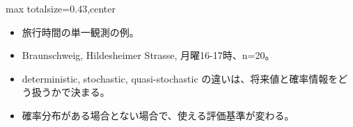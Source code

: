 \clearpage
{}
\begin{minipage}[t]{0.405\textwidth}
\begin{adjustbox}{max totalsize={\textwidth}{0.43\textheight},center}
\begin{minipage}{\textwidth}\scriptsize
{}\begin{itemize}
\item 旅行時間の単一観測の例。
\item Braunschweig, Hildesheimer Strasse, 月曜16-17時、n=20。
\end{itemize}\begin{itemize}
\item deterministic, stochastic, quasi-stochastic の違いは、将来値と確率情報をどう扱うかで決まる。
\item 確率分布がある場合とない場合で、使える評価基準が変わる。
\end{itemize}
\end{minipage}
\end{adjustbox}
\end{minipage}\hfill
